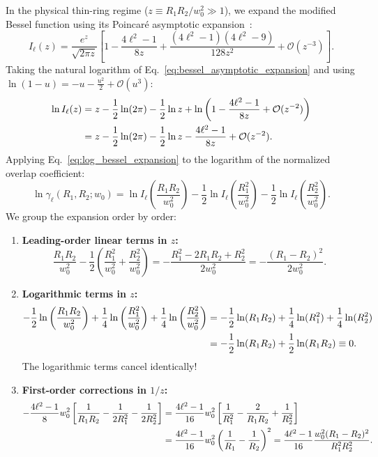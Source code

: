 \documentclass[11pt,a4paper]{article}
\begin{document}
In the physical thin-ring regime ($z \equiv R_1 R_2 / w_0^2 \gg 1$), we expand the modified Bessel function using its Poincaré asymptotic expansion~\cite{Gradshteyn2014}:
\begin{equation}
I_\ell(z) = \frac{e^z}{\sqrt{2\pi z}} \left[ 1 - \frac{4\ell^2 - 1}{8z} + \frac{(4\ell^2 - 1)(4\ell^2 - 9)}{128 z^2} + \mathcal{O}(z^{-3}) \right].
\label{eq:bessel_asymptotic_expansion}
\end{equation}
Taking the natural logarithm of Eq.~\eqref{eq:bessel_asymptotic_expansion} and using $\ln(1 - u) = -u - \frac{u^2}{2} + \mathcal{O}(u^3)$:
\begin{align}
\ln I_\ell(z) &= z - \frac{1}{2}\ln(2\pi) - \frac{1}{2}\ln z + \ln\left( 1 - \frac{4\ell^2 - 1}{8z} + \mathcal{O}(z^{-2}) \right) \notag \\
&= z - \frac{1}{2}\ln(2\pi) - \frac{1}{2}\ln z - \frac{4\ell^2 - 1}{8z} + \mathcal{O}(z^{-2}).
\label{eq:log_bessel_expansion}
\end{align}
Applying Eq.~\eqref{eq:log_bessel_expansion} to the logarithm of the normalized overlap coefficient:
\begin{equation}
\ln \gamma_\ell(R_1, R_2; w_0) = \ln I_\ell\left( \frac{R_1 R_2}{w_0^2} \right) - \frac{1}{2} \ln I_\ell\left( \frac{R_1^2}{w_0^2} \right) - \frac{1}{2} \ln I_\ell\left( \frac{R_2^2}{w_0^2} \right).
\label{eq:log_gamma_expansion}
\end{equation}
We group the expansion order by order:
\begin{enumerate}
    \item \textbf{Leading-order linear terms in $z$:}
    \begin{equation}
    \frac{R_1 R_2}{w_0^2} - \frac{1}{2} \left( \frac{R_1^2}{w_0^2} + \frac{R_2^2}{w_0^2} \right) = - \frac{R_1^2 - 2 R_1 R_2 + R_2^2}{2 w_0^2} = - \frac{(R_1 - R_2)^2}{2 w_0^2}.
    \label{eq:linear_cancellation}
    \end{equation}
    \item \textbf{Logarithmic terms in $z$:}
    \begin{align}
    - \frac{1}{2} \ln\left( \frac{R_1 R_2}{w_0^2} \right) + \frac{1}{4} \ln\left( \frac{R_1^2}{w_0^2} \right) + \frac{1}{4} \ln\left( \frac{R_2^2}{w_0^2} \right) &= - \frac{1}{2} \ln(R_1 R_2) + \frac{1}{4} \ln(R_1^2) + \frac{1}{4} \ln(R_2^2) \notag \\
    &= - \frac{1}{2} \ln(R_1 R_2) + \frac{1}{2} \ln(R_1 R_2) \equiv 0.
    \label{eq:log_cancellation}
    \end{align}
    The logarithmic terms cancel identically!
    \item \textbf{First-order corrections in $1/z$:}
    \begin{align}
    - \frac{4\ell^2 - 1}{8} w_0^2 \left[ \frac{1}{R_1 R_2} - \frac{1}{2 R_1^2} - \frac{1}{2 R_2^2} \right] &= \frac{4\ell^2 - 1}{16} w_0^2 \left[ \frac{1}{R_1^2} - \frac{2}{R_1 R_2} + \frac{1}{R_2^2} \right] \notag \\
    &= \frac{4\ell^2 - 1}{16} w_0^2 \left( \frac{1}{R_1} - \frac{1}{R_2} \right)^2 = \frac{4\ell^2 - 1}{16} \frac{w_0^2 (R_1 - R_2)^2}{R_1^2 R_2^2}.
    \label{eq:correction_algebra}
    \end{align}
\end{enumerate}
\end{document}
